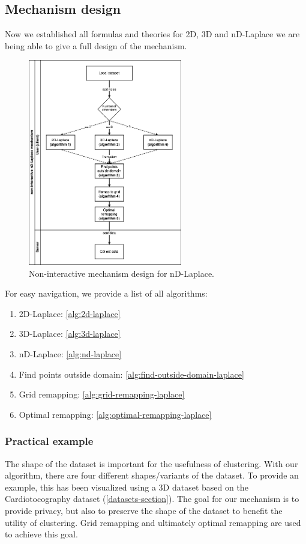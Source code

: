 \subsection{Mechanism design}
Now we established all formulas and theories for 2D, 3D and nD-Laplace we are being able to give a full design of the mechanism.

\begin{figure}[H]
    \includegraphics[width=0.6\textwidth]{TheorethicalFramework/ND-Laplace/Images/final_mechanism_design.png}
    \caption{Non-interactive mechanism design for nD-Laplace.}
    \label{fig:final-mechanism-design}
\end{figure}

For easy navigation, we provide a list of all algorithms:
\begin{enumerate}
    \item 2D-Laplace:  \ref{alg:2d-laplace}
    \item 3D-Laplace: \ref{alg:3d-laplace}
    \item nD-Laplace: \ref{alg:nd-laplace}
    \item Find points outside domain: \ref{alg:find-outside-domain-laplace}
    \item Grid remapping: \ref{alg:grid-remapping-laplace}
    \item Optimal remapping: \ref{alg:optimal-remapping-laplace}
\end{enumerate}
\newpage
\subsubsection{Practical example}
The shape of the dataset is important for the usefulness of clustering.
With our algorithm, there are four different shapes/variants of the dataset.
To provide an example, this has been visualized using a 3D dataset based on the Cardiotocography dataset (\ref{datasets-section}).
The goal for our mechanism is to provide privacy, but also to preserve the shape of the dataset to benefit the utility of clustering.
Grid remapping and ultimately optimal remapping are used to achieve this goal.

